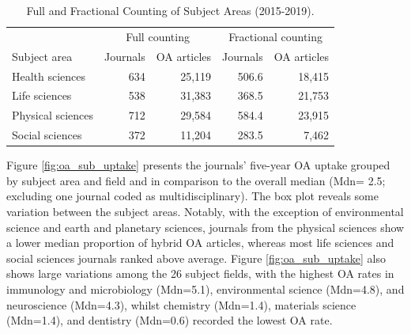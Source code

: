 \documentclass[a4paper,man,floatsintext,longtable,noextraspace,12pt]{apa6}
\begin{document}
\begin{table}

\caption{\label{tab:subject_area_table}Full and Fractional Counting of Subject Areas (2015-2019).}
\centering
\begin{tabular}[t]{lrrrr}
\toprule
\multicolumn{1}{c}{ } & \multicolumn{2}{c}{Full counting} & \multicolumn{2}{c}{Fractional counting} \\
\cmidrule(l{3pt}r{3pt}){2-3} \cmidrule(l{3pt}r{3pt}){4-5}
Subject area & Journals & OA articles & Journals & OA articles\\
\midrule
Health sciences & 634 & 25,119 & 506.6 & 18,415\\
Life sciences & 538 & 31,383 & 368.5 & 21,753\\
Physical sciences & 712 & 29,584 & 584.4 & 23,915\\
Social sciences & 372 & 11,204 & 283.5 & 7,462\\
\bottomrule
\end{tabular}
\end{table}

Figure \ref{fig:oa_sub_uptake} presents the journals' five-year OA
uptake grouped by subject area and field and in comparison to the
overall median (Mdn= 2.5; excluding one journal coded as
multidisciplinary). The box plot reveals some variation between the
subject areas. Notably, with the exception of environmental science and
earth and planetary sciences, journals from the physical sciences show a
lower median proportion of hybrid OA articles, whereas most life
sciences and social sciences journals ranked above average. Figure
\ref{fig:oa_sub_uptake} also shows large variations among the 26 subject
fields, with the highest OA rates in immunology and microbiology
(Mdn=5.1), environmental science (Mdn=4.8), and neuroscience (Mdn=4.3),
whilst chemistry (Mdn=1.4), materials science (Mdn=1.4), and dentistry
(Mdn=0.6) recorded the lowest OA rate.
\end{document}
